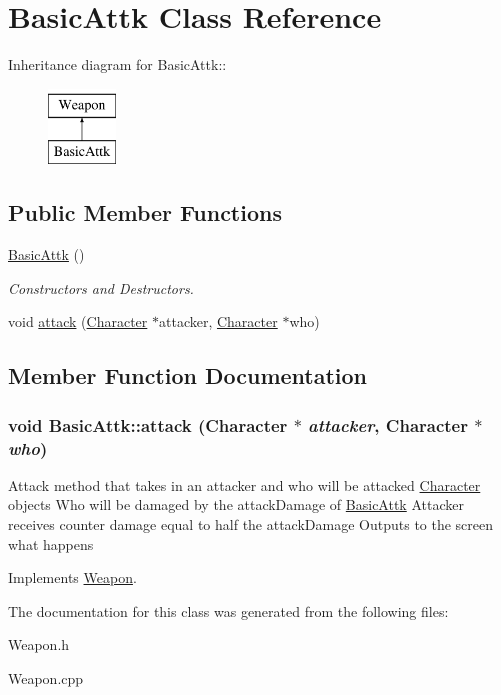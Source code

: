 \hypertarget{classBasicAttk}{
\section{BasicAttk Class Reference}
\label{classBasicAttk}
}
Inheritance diagram for BasicAttk::\begin{figure}[H]
\begin{center}
\leavevmode
\includegraphics[height=2cm]{classBasicAttk}
\end{center}
\end{figure}
\subsection*{Public Member Functions}
\begin{DoxyCompactItemize}
\item 
\hypertarget{classBasicAttk_afea1d0e3a36bb57427a0d5c01e8b54b1}{
\hyperlink{classBasicAttk_afea1d0e3a36bb57427a0d5c01e8b54b1}{BasicAttk} ()}
\label{classBasicAttk_afea1d0e3a36bb57427a0d5c01e8b54b1}

\begin{DoxyCompactList}\small\item\em Constructors and Destructors. \item\end{DoxyCompactList}\item 
void \hyperlink{classBasicAttk_a1c717fc7e6060ec94764adb1743f7ee4}{attack} (\hyperlink{classCharacter}{Character} $\ast$attacker, \hyperlink{classCharacter}{Character} $\ast$who)
\end{DoxyCompactItemize}


\subsection{Member Function Documentation}
\hypertarget{classBasicAttk_a1c717fc7e6060ec94764adb1743f7ee4}{
\subsubsection[{attack}]{\setlength{\rightskip}{0pt plus 5cm}void BasicAttk::attack ({\bf Character} $\ast$ {\em attacker}, \/  {\bf Character} $\ast$ {\em who})}}
\label{classBasicAttk_a1c717fc7e6060ec94764adb1743f7ee4}
Attack method that takes in an attacker and who will be attacked \hyperlink{classCharacter}{Character} objects Who will be damaged by the attackDamage of \hyperlink{classBasicAttk}{BasicAttk} Attacker receives counter damage equal to half the attackDamage Outputs to the screen what happens 

Implements \hyperlink{classWeapon_a74d99dd40d8872718710bcf94fff98d7}{Weapon}.

The documentation for this class was generated from the following files:\begin{DoxyCompactItemize}
\item 
Weapon.h\item 
Weapon.cpp\end{DoxyCompactItemize}
